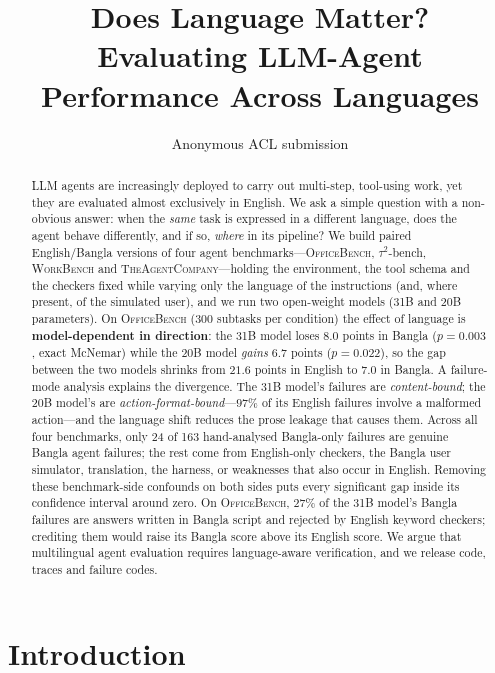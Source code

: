 \documentclass[11pt]{article}
\title{Does Language Matter? \\ Evaluating LLM-Agent Performance Across Languages}
\author{Anonymous ACL submission}
\begin{document}
\maketitle

\begin{abstract}
LLM agents are increasingly deployed to carry out multi-step, tool-using work, yet they are
evaluated almost exclusively in English. We ask a simple question with a non-obvious answer:
when the \emph{same} task is expressed in a different language, does the agent behave
differently, and if so, \emph{where} in its pipeline?
We build paired English/Bangla versions of four agent benchmarks---\textsc{OfficeBench},
$\tau^2$-bench, \textsc{WorkBench} and \textsc{TheAgentCompany}---holding the environment, the
tool schema and the checkers fixed while varying only the language of the instructions (and,
where present, of the simulated user), and we run two open-weight models (31B and 20B
parameters). On \textsc{OfficeBench} (300 subtasks per condition) the effect of language is
\textbf{model-dependent in direction}: the 31B model loses $8.0$ points in Bangla ($p{=}0.003$,
exact McNemar) while the 20B model \emph{gains} $6.7$ points ($p{=}0.022$), so the gap between
the two models shrinks from $21.6$ points in English to $7.0$ in Bangla.
A failure-mode analysis explains the divergence. The 31B model's failures are
\emph{content-bound}; the 20B model's are \emph{action-format-bound}---$97\%$ of its English
failures involve a malformed action---and the language shift reduces the prose leakage that
causes them.
Across all four benchmarks, only 24 of 163 hand-analysed Bangla-only failures are genuine Bangla
agent failures; the rest come from English-only checkers, the Bangla user simulator, translation,
the harness, or weaknesses that also occur in English. Removing these benchmark-side confounds
on both sides puts every significant gap inside its confidence interval around zero. On
\textsc{OfficeBench}, $27\%$ of the 31B model's Bangla failures are answers written in Bangla
script and rejected by English keyword checkers; crediting them would raise its Bangla score
above its English score. We argue that multilingual agent evaluation requires language-aware
verification, and we release code, traces and failure codes.
\end{abstract}

\section{Introduction}
\end{document}
